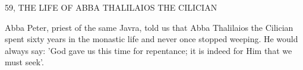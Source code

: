 59, THE LIFE OF ABBA THALILAIOS THE CILICIAN

Abba Peter, priest of the same Javra, told us that Abba Thalilaios
the Cilician spent sixty years in the monastic life and never once
stopped weeping.
He would always say: 'God gave us this time for
repentance; it is indeed for Him that we must seek'.

